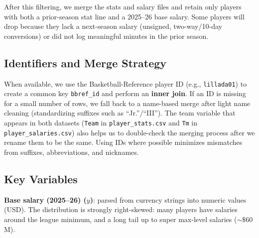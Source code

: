 \documentclass{article}
\theoremstyle{plain}
\theoremstyle{definition}
\theoremstyle{remark}
\begin{document}
After this filtering, we merge the stats and salary files and retain only players with both a prior-season stat line and a 2025--26 base salary. Some players will drop because they lack a next-season salary (unsigned, two-way/10-day conversions) or did not log meaningful minutes in the prior season.

\subsection*{Identifiers and Merge Strategy}
When available, we use the Basketball-Reference player ID (e.g., \texttt{lillada01}) to create a common key \texttt{bbref\_id} and perform an \textbf{inner join}. If an ID is missing for a small number of rows, we fall back to a name-based merge after light name cleaning (standardizing suffixes such as ``Jr.''/``III'').  The team variable that appears in both datasets (\texttt{Team} in \texttt{player\_stats.csv} and \texttt{Tm} in \texttt{player\_salaries.csv}) also helps us to double-check the merging process after we rename them to be the same. 
Using IDs where possible minimizes mismatches from suffixes, abbreviations, and nicknames.

\subsection*{Key Variables}
\textbf{Base salary (2025--26) ($y$)}: parsed from currency strings into numeric values (USD). The distribution is strongly right-skewed: many players have salaries around the league minimum, and a long tail up to super max-level salaries ($\sim\$60$M).
\end{document}
